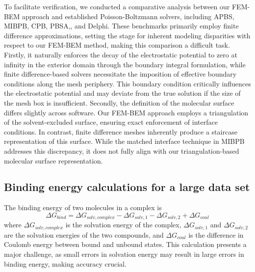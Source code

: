 To facilitate verification, we conducted a comparative analysis between our FEM-BEM approach and established Poisson-Boltzmann solvers, including APBS,\cite{BakerETal2001} MIBPB,\cite{geng2007treatment} CPB,\cite{boschitsch2011fast} PBSA,\cite{XX}, and Delphi.\cite{rocchia2001extending} 
These benchmarks primarily employ finite difference approximations, setting the stage for inherent modeling disparities with respect to our FEM-BEM method, making this comparison a difficult task.
Firstly, it naturally enforces the decay of the electrostatic potential to zero at infinity in the exterior domain through the boundary integral formulation, while finite difference-based solvers necessitate the imposition of effective boundary conditions along the mesh periphery. 
This boundary condition critically influences the electrostatic potential and may deviate from the true solution if the size of the mesh box is insufficient. 
Secondly, the definition of the molecular surface differs slightly across software. Our FEM-BEM approach employs a triangulation of the solvent-excluded surface, ensuring exact enforcement of interface conditions. 
In contrast, finite difference meshes inherently produce a staircase representation of this surface. 
While the matched interface technique in MIBPB\cite{geng2007treatment} addresses this discrepancy, it does not fully align with our triangulation-based molecular surface representation.


\subsection*{\sffamily \large Binding energy calculations for a large data set}

The binding energy of two molecules in a complex is 
%
\begin{equation}
\Delta G_{bind} = \Delta G_{solv, complex} - \Delta G_{solv,1} - \Delta G_{solv, 2} + \Delta G_{coul}
\end{equation}
%
where $\Delta G_{solv, complex}$ is the solvation energy of the complex, $\Delta G_{solv, 1}$ and $\Delta G_{solv, 2}$ are the solvation energies of the two compounds, and $\Delta G_{coul}$ is the difference in Coulomb energy between bound and unbound states.
This calculation presents a major challenge, as small errors in solvation energy may result in large errors in binding energy, making accuracy crucial.

